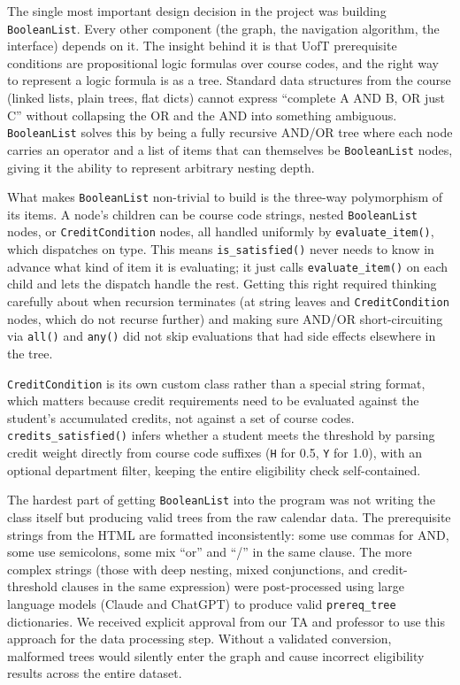 \documentclass[11pt]{article}
\begin{document}
The single most important design decision in the project was building \verb|BooleanList|.
Every other component (the graph, the navigation algorithm, the interface) depends on
it. The insight behind it is that UofT prerequisite conditions are propositional logic
formulas over course codes, and the right way to represent a logic formula is as a tree.
Standard data structures from the course (linked lists, plain trees, flat dicts) cannot
express ``complete A AND B, OR just C'' without collapsing the OR and the AND into something
ambiguous. \verb|BooleanList| solves this by being a fully recursive AND/OR tree where each
node carries an operator and a list of items that can themselves be \verb|BooleanList| nodes,
giving it the ability to represent arbitrary nesting depth.

What makes \verb|BooleanList| non-trivial to build is the three-way polymorphism of its
items. A node's children can be course code strings, nested \verb|BooleanList| nodes, or
\verb|CreditCondition| nodes, all handled uniformly by \verb|evaluate_item()|, which
dispatches on type. This means \verb|is_satisfied()| never needs to know in advance what
kind of item it is evaluating; it just calls \verb|evaluate_item()| on each child and lets
the dispatch handle the rest. Getting this right required thinking carefully about when
recursion terminates (at string leaves and \verb|CreditCondition| nodes, which do not recurse
further) and making sure AND/OR short-circuiting via \verb|all()| and \verb|any()| did not
skip evaluations that had side effects elsewhere in the tree.

\verb|CreditCondition| is its own custom class rather than a special string format, which
matters because credit requirements need to be evaluated against the student's accumulated
credits, not against a set of course codes. \verb|credits_satisfied()| infers whether a
student meets the threshold by parsing credit weight directly from course code suffixes
(\verb|H| for 0.5, \verb|Y| for 1.0), with an optional department filter, keeping the
entire eligibility check self-contained.

The hardest part of getting \verb|BooleanList| into the program was not writing the class
itself but producing valid trees from the raw calendar data. The prerequisite strings from
the HTML are formatted inconsistently: some use commas for AND, some use semicolons, some mix
``or'' and ``/'' in the same clause. The more complex strings (those with deep nesting,
mixed conjunctions, and credit-threshold clauses in the same expression) were
post-processed using large language models (Claude and ChatGPT) to produce valid
\verb|prereq_tree| dictionaries. We received explicit approval from our TA and professor to
use this approach for the data processing step. Without a validated conversion, malformed
trees would silently enter the graph and cause incorrect eligibility results across the entire
dataset.
\end{document}

